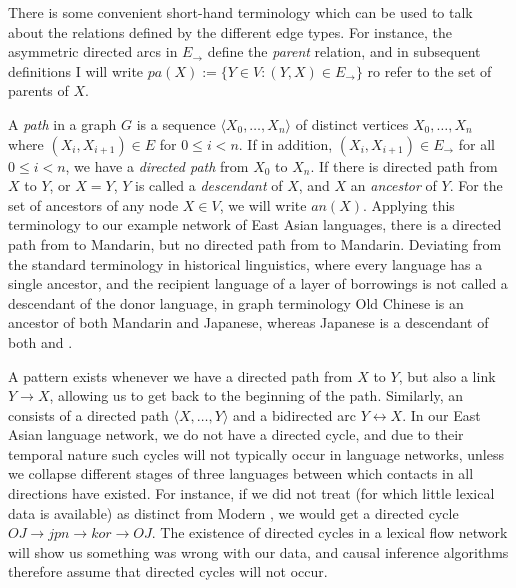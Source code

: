There is some convenient short-hand terminology which can be used to talk about the relations defined by the different edge types. For instance, the asymmetric directed arcs in $E_\rightarrow$ define the \textit{parent} relation, and in subsequent definitions I will write $pa(X) := \{Y \in V\colon (Y,X) \in E_{\rightarrow}\}$ ro refer to the set of parents of $X$.

A \textit{path} in a graph $G$ is a sequence $\langle X_0,\dots,X_n \rangle$ of distinct vertices $X_0,\dots,X_n$ where $(X_i,X_{i+1}) \in E$ for $0 \leq i < n$. If in addition, $(X_i,X_{i+1}) \in E_\rightarrow$ for all $0 \leq i < n$, we have a \textit{directed path} from $X_0$ to $X_n$. If there is directed path from $X$ to $Y$, or $X = Y$, $Y$ is called a \textit{descendant} of $X$, and $X$ an \textit{ancestor} of $Y$. For the set of ancestors of any node $X \in V$, we will write $an(X)$. Applying this terminology to our example network of East Asian languages, there is a directed path from  to Mandarin, but no directed path from  to Mandarin. Deviating from the standard terminology in historical linguistics, where every language has a single ancestor, and the recipient language of a layer of borrowings is not called a descendant of the donor language, in 
graph terminology Old Chinese is an ancestor of both Mandarin and Japanese, whereas Japanese is a descendant of both  and .

A \textit{} pattern exists whenever we have a directed path from $X$ to $Y$, but also a link $Y \rightarrow X$, allowing us to get back to the beginning of the path. Similarly, an \textit{} consists of a directed path $\langle X,\dots,Y \rangle$ and a bidirected arc $Y \leftrightarrow X$. In our East Asian language network, we do not have a directed cycle, and due to their temporal nature such cycles will not typically occur in language networks, unless we collapse different stages of three languages between which contacts in all directions have existed. For instance, if we did not treat  (for which little lexical data is available) as distinct from Modern , we would get a directed cycle $OJ \rightarrow jpn \rightarrow kor \rightarrow OJ$. The existence of directed cycles in a lexical flow network will show us something was wrong with our data, and causal inference algorithms therefore assume that directed cycles will not occur.

